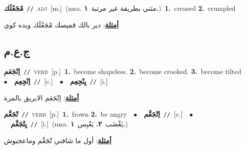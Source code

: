 \documentclass[10pt,a4paper,twoside]{article} %
\begin{document}
\begin{multicols}{2}
{\setlength\topsep{0pt}\textbf{\foreignlanguage{arabic}{مْجَعْلَك}}\ {\color{gray}\texttt{//}\color{black}}\ \textsc{adj}\ [m.]\ \color{gray}(msa. \foreignlanguage{arabic}{مثني بطريقة غير مرتبة}~\foreignlanguage{arabic}{\textbf{١.}})\color{black}\ \textbf{1.}~creased  \textbf{2.}~crumpled\  \begin{flushright}\color{gray}\foreignlanguage{arabic}{\textbf{\underline{\foreignlanguage{arabic}{أمثلة}}}: دير بالك قميصك مْجَعْلَك وبده كوي}\end{flushright}\color{black}} \vspace{2mm}

\vspace{-3mm}
\subsection*{\color{blue}\foreignlanguage{arabic}{ج.ع.م}\color{blue}{}} 

{\setlength\topsep{0pt}\textbf{\foreignlanguage{arabic}{اِنْجَعَم}}\ {\color{gray}\texttt{//}\color{black}}\ \textsc{verb}\ [p.]\ \textbf{1.}~become shapeless.  \textbf{2.}~become crooked.  \textbf{3.}~become tilted\ \ $\bullet$\ \ \setlength\topsep{0pt}\textbf{\foreignlanguage{arabic}{اِنْجِعِم}}\ {\color{gray}\texttt{//}\color{black}}\ [c.]\ \ $\bullet$\ \ \setlength\topsep{0pt}\textbf{\foreignlanguage{arabic}{يِنْجِعِم}}\ {\color{gray}\texttt{//}\color{black}}\ [i.]\  \begin{flushright}\color{gray}\foreignlanguage{arabic}{\textbf{\underline{\foreignlanguage{arabic}{أمثلة}}}: اِنْجَعَم الابريق بالمرة}\end{flushright}\color{black}} \vspace{2mm}

{\setlength\topsep{0pt}\textbf{\foreignlanguage{arabic}{تْجَعَّم}}\ {\color{gray}\texttt{//}\color{black}}\ \textsc{verb}\ [p.]\ \textbf{1.}~frown  \textbf{2.}~be angry\ \ $\bullet$\ \ \setlength\topsep{0pt}\textbf{\foreignlanguage{arabic}{اِتْجَعَّم}}\ {\color{gray}\texttt{//}\color{black}}\ [c.]\ \ $\bullet$\ \ \setlength\topsep{0pt}\textbf{\foreignlanguage{arabic}{يِتْجَعَّم}}\ {\color{gray}\texttt{//}\color{black}}\ [i.]\ \color{gray}(msa. \foreignlanguage{arabic}{يَغْضَب}~\foreignlanguage{arabic}{\textbf{٢.}}  \foreignlanguage{arabic}{يَعْبِس}~\foreignlanguage{arabic}{\textbf{١.}})\color{black}\  \begin{flushright}\color{gray}\foreignlanguage{arabic}{\textbf{\underline{\foreignlanguage{arabic}{أمثلة}}}: أول ما شافني تْجَعَّم وماعجبوش}\end{flushright}\color{black}} \vspace{2mm}


\end{multicols}
\end{document}
